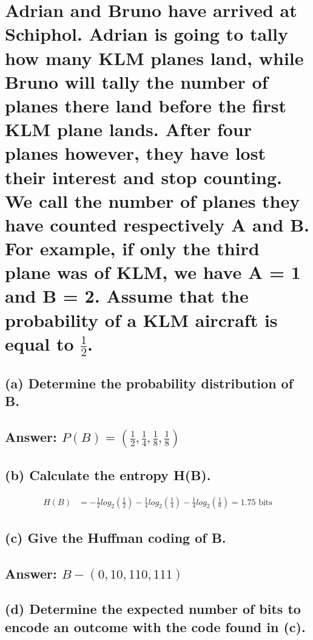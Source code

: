 \documentclass[11px]{article}
\begin{document}
\section{\normalfont Adrian and Bruno have arrived at Schiphol. Adrian is going to tally how many KLM planes land, while Bruno will tally the number of planes there land before the first KLM plane lands. After four planes however, they have lost their interest and stop counting. We call the number of planes they have counted respectively A and B. For example, if only the third plane was of KLM, we have A = 1 and B = 2. Assume that the probability of a KLM aircraft is equal to \(\frac{1}{2}\).}

\subsection*{\normalfont (a) Determine the probability distribution of B.}

\subsection*{Answer: \(P(B) = (\frac{1}{2},\frac{1}{4},\frac{1}{8},\frac{1}{8})\)}

\subsection*{\normalfont (b) Calculate the entropy H(B).}

\begin{equation}
\begin{split}
H(B) & = -\frac{1}{2}log_2(\frac{1}{2}) -\frac{1}{4}log_2(\frac{1}{4}) - \frac{1}{4}log_2(\frac{1}{8}) = 1.75 \text{ bits}
\end{split}
\end{equation}

\subsection*{\normalfont (c) Give the Huffman coding of B.}

\subsection*{Answer: \(B - (0, 10, 110, 111)\)}

\subsection*{\normalfont (d) Determine the expected number of bits to encode an outcome with the code found in (c).}
\end{document}
